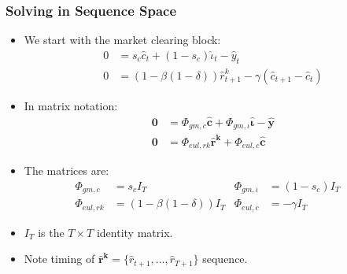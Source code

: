 \documentclass[english,xcolor=svgnames]{beamer}
\begin{document}
\begin{frame}
    \frametitle{Solving in Sequence Space}
		\begin{itemize}
			\item We start with the market clearing block:
			\begin{align*}
				 	0&=s_c\hat{c}_t + (1-s_c)\hat{\iota}_t - \hat{y}_t \\
					0&= (1-\beta(1-\delta))\hat{r}_{t+1}^k -  \gamma (\hat{c}_{t+1} - \hat{c}_{t})
			\end{align*}
			\item In matrix notation:
			\begin{align*}
				\mathbf{0} &= \Phi_{gm,c}\mathbf{\hat{c}} + \Phi_{gm,\iota}\mathbf{\hat{\iota}} - \mathbf{\hat{y}} \\
				\mathbf{0} &= \Phi_{eul,rk}\mathbf{\hat{r}^k} + \Phi_{eul,c}\mathbf{\hat{c}} 
			\end{align*}
			\item The matrices are:
			\begin{align*}
				\Phi_{gm,c} &= s_c I_T & \Phi_{gm,\iota} &= (1-s_c)I_T \quad \\
				\Phi_{eul,rk} &= (1-\beta(1-\delta))I_T & \Phi_{eul,c} &= -\gamma I_T 
			\end{align*}
			\item  $I_T$ is the $T\times T$ identity matrix. 
			\item Note timing of $\mathbf{\hat{r}^k}=\{\hat{r}_{t+1},...,\hat{r}_{T+1}\}$ sequence.
		\end{itemize}
\end{frame}
\end{document}

